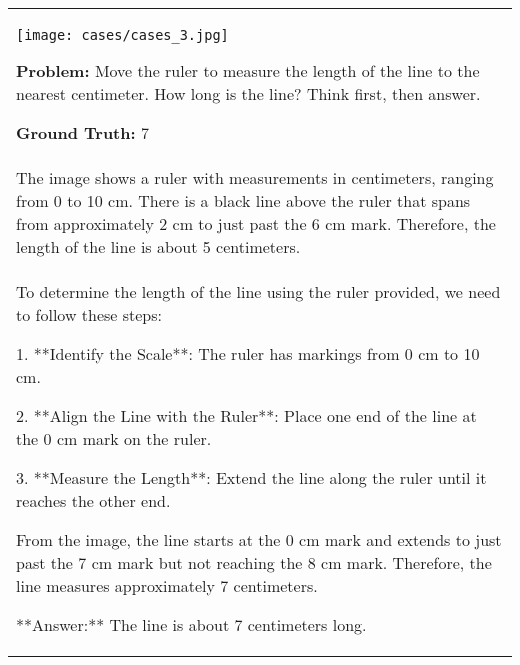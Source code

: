 \begin{table*}[htbp]
    \centering
    \renewcommand{\arraystretch}{1.2} 
    \setlength{\tabcolsep}{8pt} 
    \begin{tabular}{p{14cm}}
        \centering
        \texttt{[image: cases/cases\_3.jpg]}
        
        \begin{tcolorbox}[colback=gray!5, colframe=gray!40, sharp corners, width=\linewidth, boxrule=0.5mm]
        \small
        \textbf{Problem: }
        Move the ruler to measure the length of the line to the nearest centimeter. How long is the line? Think first, then answer.

        \textbf{Ground Truth:} 7
        \end{tcolorbox}  %
        \begin{tcolorbox}[colback=gray!5, colframe=gray!40, sharp corners, width=\linewidth, boxrule=0.5mm]
            \small
            \textbf{$\beta=0$:}
            \\
The image shows a ruler with measurements in centimeters, ranging from 0 to 10 cm. There is a black line above the ruler that spans from approximately 2 cm to just past the 6 cm mark. Therefore, the length of the line is about 5 centimeters.


        \end{tcolorbox}
        

        \begin{tcolorbox}[colback=gray!5, colframe=gray!40, sharp corners, width=\linewidth, boxrule=0.5mm]
        \small
        \textbf{$\beta=0.1$:}
        \\
To determine the length of the line using the ruler provided, we need to follow these steps:

1. **Identify the Scale**: The ruler has markings from 0 cm to 10 cm.

2. **Align the Line with the Ruler**: Place one end of the line at the 0 cm mark on the ruler.

3. **Measure the Length**: Extend the line along the ruler until it reaches the other end.

From the image, the line starts at the 0 cm mark and extends to just past the 7 cm mark but not reaching the 8 cm mark. Therefore, the line measures approximately 7 centimeters.

**Answer:** The line is about 7 centimeters long.

\end{tcolorbox}


\end{tabular}
\end{table*}
